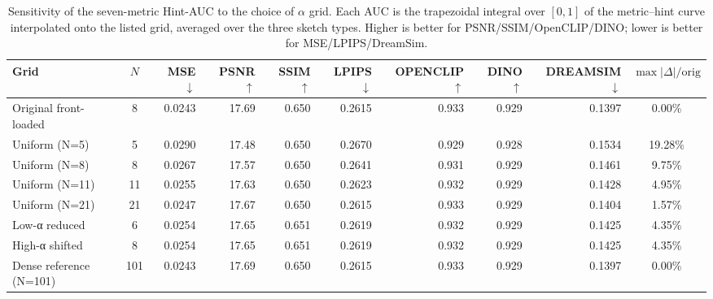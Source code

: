 \begin{table}[t]
  \centering
  \caption{Sensitivity of the seven-metric Hint-AUC to the choice of $\alpha$ grid. Each AUC is the trapezoidal integral over $[0,1]$ of the metric--hint curve interpolated onto the listed grid, averaged over the three sketch types. Higher is better for PSNR/SSIM/OpenCLIP/DINO; lower is better for MSE/LPIPS/DreamSim.}
  \label{tab:S-R2-1-B-2-7m}
  \small
  \begin{tabular}{l c rrrrrrr c}
    \toprule
    Grid & $N$ & MSE $\downarrow$ & PSNR $\uparrow$ & SSIM $\uparrow$ & LPIPS $\downarrow$ & OPENCLIP $\uparrow$ & DINO $\uparrow$ & DREAMSIM $\downarrow$ & $\max\!\big|\Delta\big|/\mathrm{orig}$ \\
    \midrule
    Original front-loaded      &   8 & 0.0243 & 17.69 & 0.650 & 0.2615 & 0.933 & 0.929 & 0.1397 &  0.00\% \\
    Uniform (N=5)              &   5 & 0.0290 & 17.48 & 0.650 & 0.2670 & 0.929 & 0.928 & 0.1534 & 19.28\% \\
    Uniform (N=8)              &   8 & 0.0267 & 17.57 & 0.650 & 0.2641 & 0.931 & 0.929 & 0.1461 &  9.75\% \\
    Uniform (N=11)             &  11 & 0.0255 & 17.63 & 0.650 & 0.2623 & 0.932 & 0.929 & 0.1428 &  4.95\% \\
    Uniform (N=21)             &  21 & 0.0247 & 17.67 & 0.650 & 0.2615 & 0.933 & 0.929 & 0.1404 &  1.57\% \\
    Low-α reduced              &   6 & 0.0254 & 17.65 & 0.651 & 0.2619 & 0.932 & 0.929 & 0.1425 &  4.35\% \\
    High-α shifted             &   8 & 0.0254 & 17.65 & 0.651 & 0.2619 & 0.932 & 0.929 & 0.1425 &  4.35\% \\
    Dense reference (N=101)    & 101 & 0.0243 & 17.69 & 0.650 & 0.2615 & 0.933 & 0.929 & 0.1397 &  0.00\% \\
    \bottomrule
  \end{tabular}
\end{table}
